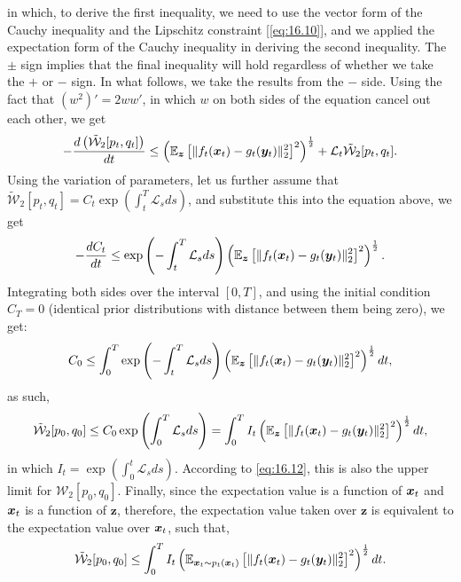 in which, to derive the first inequality, we need to use the vector form of the Cauchy inequality and the Lipschitz constraint [\cref{eq:16.10}], and we applied the expectation form of the Cauchy inequality in deriving the second inequality. The $\pm$ sign implies that the final inequality will hold regardless of whether we take the $+$ or $-$ sign. In what follows, we take the results from the $-$ side. Using the fact that $(w^2)'=2ww'$, in which $w$ on both sides of the equation cancel out each other, we get
\begin{equation}
    \label{eq:16.14}
    -\frac{d\left(\tilde{\mathcal{W}}_2[p_t,q_t]\right)}{dt}\leq \left(\mathbb{E}_{\bm{z}}\left[ \|f_t(\bm{x}_t)-g_t(\bm{y}_t)\|^2_2\right]^2 \right)^{\frac{1}{2}} + \mathcal{L}_t\tilde{\mathcal{W}}_2[p_t,q_t].
\end{equation}
Using the variation of parameters, let us further assume that $\tilde{\mathcal{W}}_2[p_t,q_t]=C_t \exp\left(\int_t^T \mathcal{L}_s ds \right)$, and substitute this into the equation above, we get 
\begin{equation}
    \label{eq:16.15}
    -\frac{d C_t}{dt}\leq \exp\left(-\int_t^T \mathcal{L}_s ds \right) \left(\mathbb{E}_{\bm{z}}\left[ \|f_t(\bm{x}_t)-g_t(\bm{y}_t)\|^2_2\right]^2 \right)^{\frac{1}{2}}.
\end{equation}
Integrating both sides over the interval $[0,T]$, and using the initial condition $C_T=0$ (identical prior distributions with distance between them being zero), we get:
\begin{equation}
    \label{eq:16.16}
    C_0\leq \int_0^T \exp\left(-\int_t^T \mathcal{L}_s ds \right) \left(\mathbb{E}_{\bm{z}}\left[ \|f_t(\bm{x}_t)-g_t(\bm{y}_t)\|^2_2\right]^2 \right)^{\frac{1}{2}} dt, 
\end{equation}
as such,
\marginnote{\footnotesize{\textcolor{red}{This bit is also a bit puzzling.}}}
\begin{equation}
    \label{eq:16.17}
    \tilde{\mathcal{W}}_2[p_0,q_0]\leq C_0\exp\left(\int_0^T\mathcal{L}_{s}ds\right)=\int_0^T I_t\left(\mathbb{E}_{\bm{z}}\left[ \|f_t(\bm{x}_t)-g_t(\bm{y}_t)\|^2_2\right]^2 \right)^{\frac{1}{2}} dt,
\end{equation}
in which $I_t=\exp\left(\int_0^t\mathcal{L}_s ds\right)$. According to \cref{eq:16.12}, this is also the upper limit for $\mathcal{W}_2[p_0,q_0]$. Finally, since the expectation value is a function of $\bm{x}_{t}$ and $\bm{x}_{t}$ is a function of $\bm{z}$, therefore, the expectation value taken over $\bm{z}$ is equivalent to the expectation value over $\bm{x}_{t}$, such that,
\begin{equation}
    \label{eq:16.18}
    \tilde{\mathcal{W}}_2[p_0,q_0]\leq \int_0^T I_t\left(\mathbb{E}_{\bm{x}_{t}\sim p_t(\bm{x}_{t})}\left[ \|f_t(\bm{x}_t)-g_t(\bm{y}_t)\|^2_2\right]^2 \right)^{\frac{1}{2}} dt.
\end{equation}

